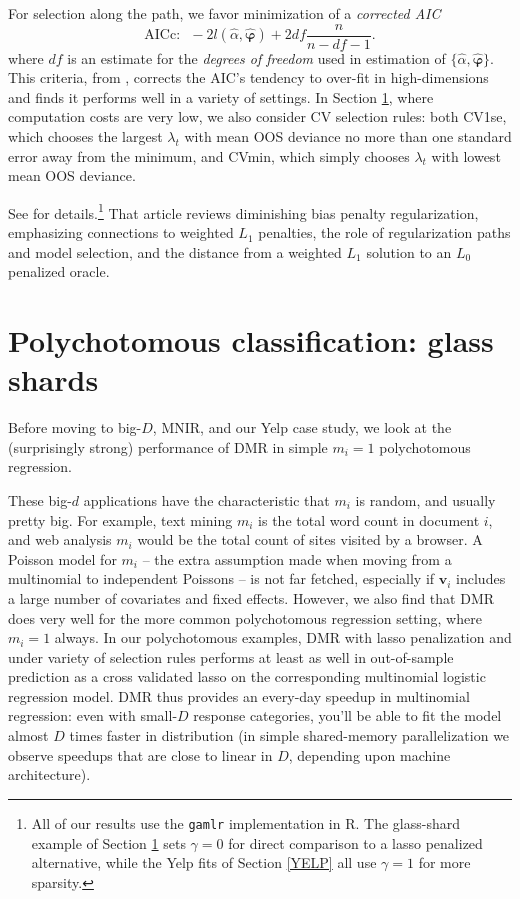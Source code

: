 \documentclass[12pt]{article}
\newcommand{\bs}[1]{\boldsymbol{#1}}
\newcommand{\bm}[1]{\mathbf{#1}}
\begin{document}
For selection along the path, we
favor minimization of a {\it corrected AIC}
\begin{equation}
\text{AICc:}~~~-2l(\hat\alpha,\bs{\hat\varphi}) + 2df\frac{n}{n-df-1}.
\end{equation}
where $df$ is an estimate for the {\it degrees of freedom} used in estimation
of $\{\hat\alpha,\bs{\hat\varphi}\}$.  This criteria, from
\cite{hurvich_regression_1989}, corrects the AIC's tendency to over-fit in
high-dimensions and \cite{taddy_gamma_2013} finds it performs well in a variety
of settings.  In Section \ref{FGL}, where computation costs are very low, we
also consider CV selection rules: both CV1se, which chooses the largest
$\lambda_t$ with mean OOS deviance no more than one standard error away from
the minimum, and CVmin, which simply chooses $\lambda_t$ with lowest mean
OOS deviance.

See \cite{taddy_gamma_2013} for details.\footnote{All of our results use the
{\tt gamlr} implementation in R.  The glass-shard example of Section \ref{FGL}
sets $\gamma=0$ for direct comparison to a lasso penalized alternative, while
the Yelp fits of Section \ref{YELP} all use $\gamma=1$ for more sparsity.}
That article reviews diminishing bias penalty regularization, emphasizing
connections to weighted $L_1$ penalties, the role of regularization paths and
model selection, and the distance from a weighted $L_1$ solution to an $L_0$
penalized oracle.

\section{Polychotomous classification: glass shards}
\label{FGL}

Before moving to big-$D$, MNIR, and our Yelp case study, we look at the
(surprisingly strong) performance of DMR in simple $m_i=1$ polychotomous
regression.


These big-$d$ applications have the characteristic that $m_i$ is
random, and usually pretty big.  For example, text mining $m_i$ is the total
word count in document $i$, and web analysis $m_i$ would be the total count of
sites visited by a browser.  A Poisson model for $m_i$ -- the extra assumption
made when moving from a multinomial to independent Poissons -- is not far
fetched, especially if $\bm{v}_i$ includes a large number of covariates and
fixed effects.  However, we also find that DMR does very well for the more
common polychotomous regression setting, where $m_i=1$ always.   In our
polychotomous examples, DMR with lasso penalization and under variety of
selection rules performs at least as well in out-of-sample prediction as a
cross validated lasso on the corresponding multinomial logistic regression
model.  DMR thus provides an every-day speedup in
multinomial regression: even with small-$D$ response
categories, you'll be able to fit the model almost $D$ times faster in
distribution (in simple shared-memory parallelization we observe speedups that
are close to linear in $D$, depending upon machine architecture).
\end{document}
